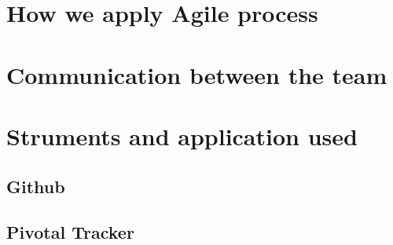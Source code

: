 
\section{How we apply Agile process}

\section{Communication between the team}

\section{Struments and application used}
	\subsection{Github}
	\subsection{Pivotal Tracker}
	
